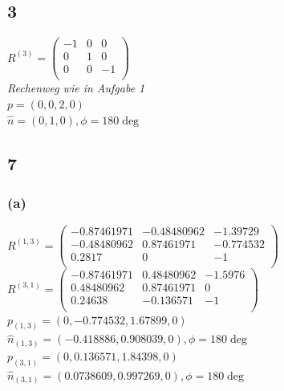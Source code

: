 \documentclass{../Vorlage/mat}
\begin{document}
\subsection*{3}
$R^{(3)} = \begin{pmatrix}
-1 & 0 & 0 \\
0 & 1 & 0\\
0 & 0 & -1\\
\end{pmatrix}
$\\
\textit{Rechenweg wie in Aufgabe 1}\\
$p = \left(0,0,2,0\right)$\\
$\hat{n} =(0,1,0) , \phi = 180\deg$


\subsection*{7}
\subsubsection*{(a)}
$R^{(1,3)} = \begin{pmatrix}
	-0.87461971 & -0.48480962 & -1.39729 \\
	-0.48480962 & 0.87461971 & -0.774532 \\
	0.2817 & 0 & -1 \\
	\end{pmatrix}$\\
$R^{(3,1)} = \begin{pmatrix}
	-0.87461971 & 0.48480962 & -1.5976\\
	0.48480962 & 0.87461971 & 0\\
	0.24638 & -0.136571 & -1\\
\end{pmatrix}$\\
$p_{(1,3)} = (0, -0.774532, 1.67899, 0)$\\
$\hat{n}_{(1,3)} = (-0.418886, 0.908039, 0) , \phi = 180\deg$\\

$p_{(3,1)} = (0, 0.136571, 1.84398, 0)$\\
$\hat{n}_{(3,1)} = (0.0738609, 0.997269, 0) , \phi = 180\deg$\\



	
\end{document}
